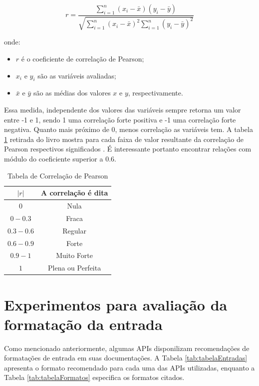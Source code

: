 \[
 r = \frac{\sum_{i=1}^{n} (x_i - \bar{x})(y_i - \bar{y})}{\sqrt{\sum_{i=1}^{n} (x_i - \bar{x})^2 \sum_{i=1}^{n} (y_i - \bar{y})^2}}
\]

 onde:
 \begin{itemize}
     \item \(r\) é o coeficiente de correlação de Pearson;
     \item \(x_i\) e \(y_i\) são as variáveis avaliadas;
     \item \(\bar{x}\) e \(\bar{y}\) são as médias dos valores \(x\) e \(y\), respectivamente.

 \end{itemize}

 Essa medida, independente dos valores das variáveis sempre retorna um valor entre -1 e 1, sendo 1 uma correlação forte positiva e -1 uma correlação forte negativa. Quanto mais próximo de 0, menos correlação as variáveis tem. A tabela \ref{tab:correlacaoPearson} retirada do livro mostra para cada faixa de valor resultante da correlação de Pearson respectivos significados \cite{callegari2007}. É interessante portanto encontrar relações com  módulo do coeficiente superior a 0.6.

\begin{table}[ht]
 \centering
 \caption{Tabela de Correlação de Pearson}
 \label{tab:correlacaoPearson}
 \begin{tabular}{|c|c|}
 \hline
 $|r|$ & A correlação é dita \\
 \hline
 $0$ & Nula \\
 $0 - 0.3$ & Fraca \\
 $0.3 - 0.6$ & Regular \\
 $0.6 - 0.9$ & Forte \\
 $0.9 - 1$ & Muito Forte \\
 $1$ & Plena ou Perfeita \\
 \hline
 \end{tabular}
\end{table}

\section{Experimentos para avaliação da formatação da entrada}

Como mencionado anteriormente, algumas APIs disponilizam recomendações de formatações de entrada em suas documentações. A Tabela \ref{tab:tabelaEntradas} apresenta o formato recomendado para cada uma das APIs utilizadas, enquanto a Tabela \ref{tab:tabelaFormatos} especifica os formatos citados. 

